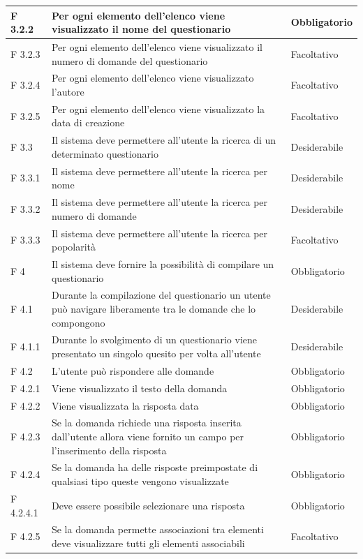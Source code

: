\documentclass[a4paper,11pt]{article}
\begin{document}
\begin{longtable}{p{}p{}p{}}
\midrule
F 3.2.2 & Per ogni elemento dell'elenco viene visualizzato il nome del questionario & Obbligatorio\\
\midrule
F 3.2.3 & Per ogni elemento dell'elenco viene visualizzato il numero di domande del questionario & Facoltativo\\
\midrule
F 3.2.4 & Per ogni elemento dell'elenco viene visualizzato l'autore & Facoltativo\\
\midrule
F 3.2.5 & Per ogni elemento dell'elenco viene visualizzato la data di creazione & Facoltativo\\
\midrule
F 3.3 & Il sistema deve permettere all'utente la ricerca di un determinato questionario & Desiderabile\\
\midrule
F 3.3.1 & Il sistema deve permettere all'utente la ricerca per nome & Desiderabile\\
\midrule
F 3.3.2 & Il sistema deve permettere all'utente la ricerca per numero di domande & Desiderabile\\
\midrule
F 3.3.3 & Il sistema deve permettere all'utente la ricerca per popolarità & Facoltativo\\
\midrule
F 4 & Il sistema deve fornire la possibilità di compilare un questionario & Obbligatorio\\
\midrule
F 4.1 & Durante la compilazione del questionario un utente può navigare liberamente tra le domande che lo compongono & Desiderabile\\
\midrule
F 4.1.1 & Durante lo svolgimento di un questionario viene presentato un singolo quesito per volta all'utente & Desiderabile\\
\midrule
F 4.2 & L'utente può rispondere alle domande & Obbligatorio\\
\midrule
F 4.2.1 & Viene visualizzato il testo della domanda & Obbligatorio\\
\midrule
F 4.2.2 & Viene visualizzata la risposta data & Obbligatorio\\
\midrule
F 4.2.3 & Se la domanda richiede una risposta inserita dall'utente allora viene fornito un campo per l'inserimento della risposta & Obbligatorio\\
\midrule
F 4.2.4 & Se la domanda ha delle risposte preimpostate di qualsiasi tipo queste vengono visualizzate & Obbligatorio\\
\midrule
F 4.2.4.1 & Deve essere possibile selezionare una risposta & Obbligatorio\\
\midrule
F 4.2.5 & Se la domanda permette associazioni tra elementi deve visualizzare tutti gli elementi associabili & Facoltativo\\

\end{longtable}
\end{document}
